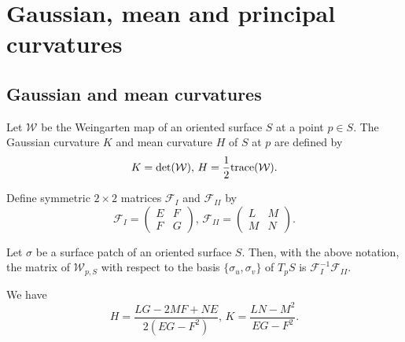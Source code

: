 \section{Gaussian, mean and principal curvatures}

\subsection{Gaussian and mean curvatures}

\begin{defn}
  Let $\mathcal{W}$ be the Weingarten map of an oriented surface $S$
  at a point $p \in S$. The Gaussian curvature $K$ and mean curvature
  $H$ of $S$ at $p$ are defined by
  \[
    K = \det(\mathcal{W}), \, H = \frac{1}{2}\text{trace}(\mathcal{W}).
  \]
\end{defn}

Define symmetric $2 \times 2$ matrices $\mathcal{F}_I$ and $\mathcal{F}_{II}$ by
\[
  \mathcal{F}_I = \begin{pmatrix}
    E & F \\
    F & G
  \end{pmatrix}, \,
  \mathcal{F}_{II} = \begin{pmatrix}
    L & M \\
    M & N
  \end{pmatrix}.
\]

\begin{proposition}
  Let $\sigma$ be a surface patch of an oriented surface $S$.
  Then, with the above notation, the matrix of $\mathcal{W}_{p, S}$
  with respect to the basis $\{\sigma_u, \sigma_v\}$ of $T_p S$ is
  $\mathcal{F}_I^{-1} \mathcal{F}_{II}$.
\end{proposition}

\begin{corollary}
  We have
  \[
    H = \frac{LG - 2MF + NE}{2(EG - F^2)}, \,
    K = \frac{LN - M^2}{EG - F^2}.
  \]
\end{corollary}
